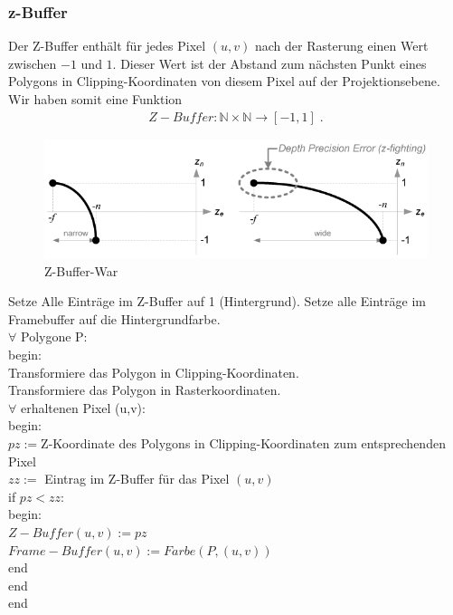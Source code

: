 \subsubsection* {z-Buffer}
Der Z-Buffer enthält für jedes Pixel $(u,v)$ nach der Rasterung  einen Wert zwischen $-1$ und $1$. Dieser Wert  ist der Abstand zum nächsten Punkt eines Polygons  in Clipping-Koordinaten von diesem Pixel auf der Projektionsebene.  Wir haben somit eine Funktion
\begin{align*}
Z-Buffer : \mathbb{N} \times \mathbb{N} \to [-1,1]  \; .
\end{align*}

\begin{figure}[H]
    \centering
    \includegraphics[width=1.0\textwidth]{images/gl_projectionmatrix_zbuffer_1.png}
    \caption{Z-Buffer-War}
    \label{fig:zbuffer-war}
\end{figure}



\begin{Algorithmus}
Setze Alle Einträge im Z-Buffer auf 1 (Hintergrund).
Setze alle Einträge im Framebuffer auf die Hintergrundfarbe. \\
$\forall$ Polygone P: \\
begin: \\
Transformiere das Polygon in Clipping-Koordinaten. \\
Transformiere das Polygon in Rasterkoordinaten. \\
$\forall$ erhaltenen Pixel (u,v): \\
begin: \\
$pz := $Z-Koordinate des Polygons in Clipping-Koordinaten zum entsprechenden Pixel \\
$zz:=$ Eintrag im Z-Buffer für das Pixel $(u,v)$ \\
if $pz < zz$: \\
begin: \\
$Z-Buffer(u,v) := pz$ \\
$Frame-Buffer(u,v) := Farbe(P,(u,v))$ \\
end \\
end \\
end
\end{Algorithmus}


